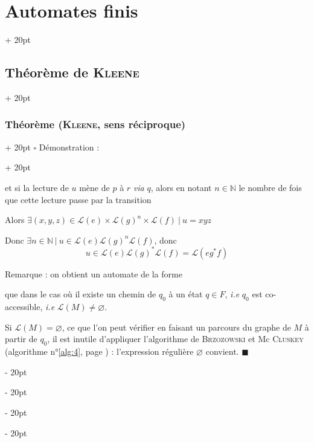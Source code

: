 \documentclass[a4paper, 12pt, twoside]{article}
\newcommand{\N}{\mathbb{N}} %
\newcommand{\ind}[1][20pt]{\advance\leftskip + #1}
\newcommand{\deind}[1][20pt]{\advance\leftskip - #1}
\newenvironment{indt}[2][20pt]{#2 \par \ind[#1]}{\par \deind} %
\newenvironment{proof}[1][{Démonstration :}]{\begin{indt}{$\square$ #1}}{$\blacksquare$ \end{indt}}
\begin{document}
\begin{indt}{\section{Automates finis}}
\begin{indt}{\subsection{Théorème de \textsc{Kleene}}}
\begin{indt}{\subsubsection{Théorème (\textsc{Kleene}, sens réciproque)}}
\begin{proof}
\begin{center}
                    \end{center}
                    et si la lecture de $u$ mène de $p$ à $r$ \textit{via} $q$, alors en notant $n \in \N$ le nombre de fois que cette lecture passe par la transition
                    \begin{center}
                    \end{center}
                    Alors $\exists (x, y, z) \in \mathcal L(e) \times \mathcal L(g)^n \times \mathcal L(f)\ |\ u = xyz$

                    Donc $\exists n \in \N\ |\ u \in \mathcal L(e) \mathcal L(g)^n \mathcal L(f)$, donc
                    \[
                        u \in \mathcal L(e) \mathcal L(g)^* \mathcal L(f)
                        = \mathcal L(eg^*f)
                    \]

                    \vspace{6pt}
                    
                    Remarque : on obtient un automate de la forme
                    \begin{center}
                    \end{center}
                    que dans le cas où il existe un chemin de $q_0$ à un état $q \in F$, \textit{i.e} $q_0$ est co-accessible, \textit{i.e} $\mathcal L(M) \neq \varnothing$.

                    Si $\mathcal L(M) = \varnothing$, ce que l'on peut vérifier en faisant un parcours du graphe de $M$ à partir de $q_0$, il est inutile d'appliquer l'algorithme de \textsc{Brzozowski} et Mc \textsc{Cluskey} (algorithme n°\ref{alg:4}, page \pageref{alg:4}) : l'expression régulière $\varnothing$ convient.
                \end{proof}
            \end{indt}


\end{indt}
\end{indt}
\end{document}
